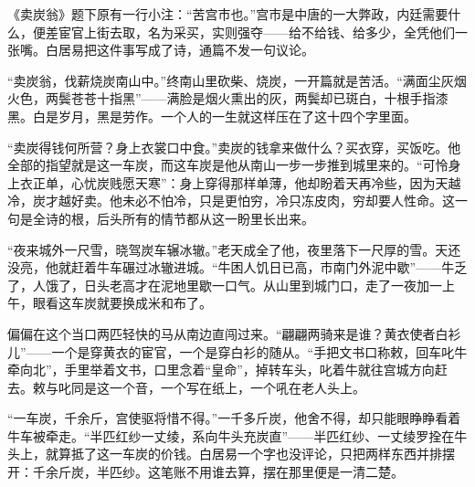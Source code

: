 \begin{appreciation}
《卖炭翁》题下原有一行小注：“苦宫市也。”宫市是中唐的一大弊政，内廷需要什么，便差宦官上街去取，名为采买，实则强夺——给不给钱、给多少，全凭他们一张嘴。白居易把这件事写成了诗，通篇不发一句议论。

“卖炭翁，伐薪烧炭南山中。”终南山里砍柴、烧炭，一开篇就是苦活。“满面尘灰烟火色，两鬓苍苍十指黑”——满脸是烟火熏出的灰，两鬓却已斑白，十根手指漆黑。白是岁月，黑是劳作。一个人的一生就这样压在了这十四个字里面。

“卖炭得钱何所营？身上衣裳口中食。”卖炭的钱拿来做什么？买衣穿，买饭吃。他全部的指望就是这一车炭，而这车炭是他从南山一步一步推到城里来的。“可怜身上衣正单，心忧炭贱愿天寒”：身上穿得那样单薄，他却盼着天再冷些，因为天越冷，炭才越好卖。他未必不怕冷，只是更怕穷，冷只冻皮肉，穷却要人性命。这一句是全诗的根，后头所有的情节都从这一盼里长出来。

“夜来城外一尺雪，晓驾炭车辗冰辙。”老天成全了他，夜里落下一尺厚的雪。天还没亮，他就赶着牛车碾过冰辙进城。“牛困人饥日已高，市南门外泥中歇”——牛乏了，人饿了，日头老高才在泥地里歇一口气。从山里到城门口，走了一夜加一上午，眼看这车炭就要换成米和布了。

偏偏在这个当口两匹轻快的马从南边直闯过来。“翩翩两骑来是谁？黄衣使者白衫儿”——一个是穿黄衣的宦官，一个是穿白衫的随从。“手把文书口称敕，回车叱牛牵向北”，手里举着文书，口里念着“皇命”，掉转车头，叱着牛就往宫城方向赶去。敕与叱同是这一个音，一个写在纸上，一个吼在老人头上。

“一车炭，千余斤，宫使驱将惜不得。”一千多斤炭，他舍不得，却只能眼睁睁看着牛车被牵走。“半匹红纱一丈绫，系向牛头充炭直”——半匹红纱、一丈绫罗拴在牛头上，就算抵了这一车炭的价钱。白居易一个字也没评论，只把两样东西并排摆开：千余斤炭，半匹纱。这笔账不用谁去算，摆在那里便是一清二楚。
\end{appreciation}
